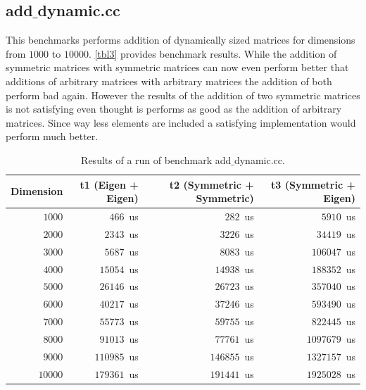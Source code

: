 \documentclass[a4wide]{scrartcl}
\begin{document}
\subsection{add$\_$dynamic.cc}
This benchmarks performs addition of dynamically sized matrices for dimensions from $1000$ to $10000$. \autoref{tbl3} provides benchmark results. While the addition of symmetric matrices with symmetric matrices can now even perform better that additions of arbitrary matrices with arbitrary matrices the addition of both perform bad again. However the results of the addition of two symmetric matrices is not satisfying even thought is performs as good as the addition of arbitrary matrices. Since way less elements are included a satisfying implementation would perform much better. 
\begin{table}
    \centering
\begin{tabular}{r|r|r|r}
    Dimension & t1 (Eigen + Eigen)  & t2 (Symmetric + Symmetric) & t3 (Symmetric + Eigen)  \\ \hline \hline
    $1000$  & $466$~us & $282$~us & $5910$~us\\
    $2000$  & $2343$~us & $3226$~us & $34419$~us\\
    $3000$  & $5687$~us & $8083$~us & $106047$~us\\
    $4000$  & $15054$~us & $14938$~us & $188352$~us\\
    $5000$  & $26146$~us & $26723$~us & $357040$~us\\
    $6000$  & $40217$~us & $37246$~us & $593490$~us\\
    $7000$  & $55773$~us & $59755$~us & $822445$~us \\
    $8000$  & $91013$~us & $77761$~us & $1097679$~us \\
    $9000$  & $110985$~us & $146855$~us & $1327157$~us\\
    $10000$ & $179361$~us & $191441$~us & $1925028$~us
    \end{tabular}
    \caption{Results of a run of benchmark add$\_$dynamic.cc.}
    \label{tbl3}
\end{table}
\end{document}
